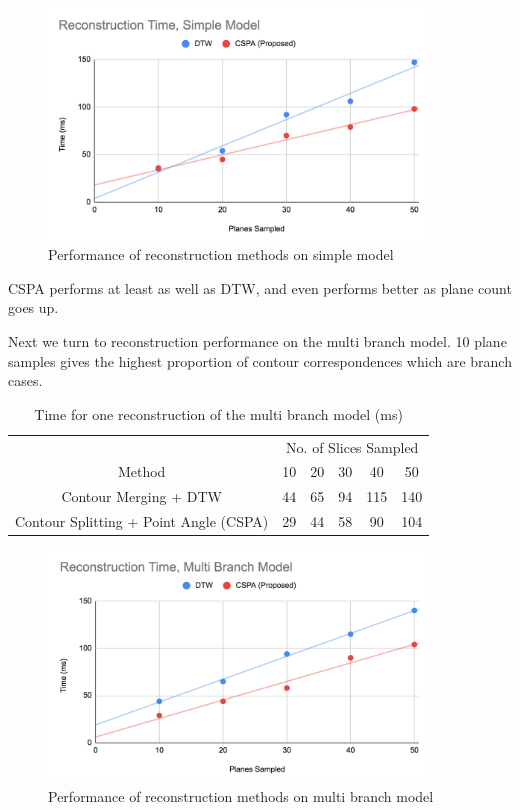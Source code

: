 \documentclass[11p, titlepage]{article}
\begin{document}
\begin{figure}[h!]
\centering
\includegraphics[width=0.9\textwidth]{graphs/performance-simple}
\caption{Performance of reconstruction methods on simple model\label{fig:performance_simple}}
\end{figure}
\FloatBarrier

CSPA performs at least as well as DTW, and even performs better as plane count goes up.

Next we turn to reconstruction performance on the multi branch model. 10 plane samples gives the highest proportion of contour correspondences which are branch cases. 

\begin{table}[h!]
\begin{tabular}{ | c | c | c | c | c | c | }
\hline
& \multicolumn{5}{c|}{No. of Slices Sampled} \\
\cline{2-6}
Method & 10 & 20 & 30 & 40 & 50 \\
\hline
Contour Merging + DTW & 44 & 65 & 94 & 115 & 140 \\
Contour Splitting + Point Angle (CSPA) & 29 & 44 & 58 & 90 & 104 \\
\hline
\end{tabular}
\caption{Time for one reconstruction of the multi branch model (ms)}
\label{table:performance_multi_branch}
\end{table}

\begin{figure}[h!]
\centering
\includegraphics[width=0.9\textwidth]{graphs/performance-multi-branch}
\caption{Performance of reconstruction methods on multi branch model\label{fig:performance_multi_branch}}
\end{figure}
\FloatBarrier
\end{document}
